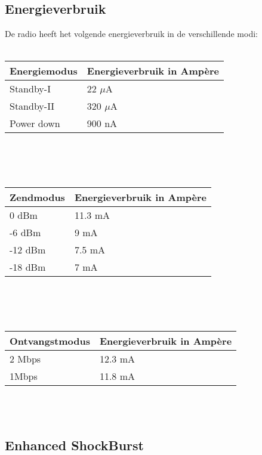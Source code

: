 \documentclass{article}
\begin{document}
\subsection{Energieverbruik}	
De radio heeft het volgende energieverbruik in de verschillende modi:\\
\\	
\begin{tabular}{|l|l|}
\hline
\textbf{Energiemodus}  & \textbf{Energieverbruik in Amp\`ere}     \\
\hline
Standby-I   & 22 $\mu$A    	\\
Standby-II  & 320 $\mu$A	\\
Power down  & 900 nA \\ \hline
\end{tabular}\\
\\
\\
\begin{tabular}{|l|l|}
\hline
\textbf{Zendmodus}  & \textbf{Energieverbruik in Amp\`ere}     \\
\hline
0 dBm  	& 11.3 mA	\\
-6 dBm 	& 9 mA    	\\
-12 dBm & 7.5 mA  	\\
-18 dBm & 7 mA		\\ \hline
\end{tabular}\\
\\
\\
\begin{tabular}{|l|l|}
\hline
\textbf{Ontvangstmodus}  & \textbf{Energieverbruik in Amp\`ere}     \\
\hline
2 Mbps  & 12.3 mA    \\
1Mbps	& 11.8 mA    \\ \hline 
\end{tabular}\\
\\

\subsection{Enhanced ShockBurst}
\end{document}
